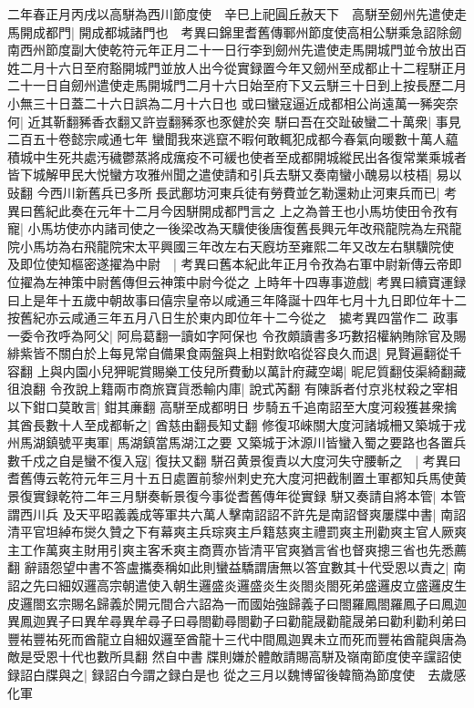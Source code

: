 二年春正月丙戌以高駢為西川節度使　辛巳上祀圓丘赦天下　高駢至劒州先遣使走馬開成都門|{
	開成都城諸門也　考異曰錦里耆舊傳鄆州節度使高相公駢乘急詔除劒南西州節度副大使乾符元年正月二十一日行李到劒州先遣使走馬開城門並令放出百姓二月十六日至府豁開城門並放人出今從實録置今年又劒州至成都止十二程駢正月二十一日自劒州遣使走馬開城門二月十六日始至府下又云駢三十日到上按長歷二月小無三十日蓋二十六日誤為二月十六日也}
或曰蠻寇逼近成都相公尚遠萬一豨突奈何|{
	近其靳翻豨香衣翻又許豈翻豨豕也豕健於突}
駢曰吾在交趾破蠻二十萬衆|{
	事見二百五十卷懿宗咸通七年}
蠻聞我來逃竄不暇何敢輒犯成都今春氣向暖數十萬人藴積城中生死共處汚穢鬱蒸將成癘疫不可緩也使者至成都開城縱民出各復常業乘城者皆下城解甲民大悦蠻方攻雅州聞之遣使請和引兵去駢又奏南蠻小醜易以枝梧|{
	易以䜴翻}
今西川新舊兵已多所長武鄜坊河東兵徒有勞費並乞勒還勑止河東兵而已|{
	考異曰舊紀此奏在元年十二月今因駢開成都門言之}
上之為普王也小馬坊使田令孜有寵|{
	小馬坊使亦内諸司使之一後梁改為天驥使後唐復舊長興元年改飛龍院為左飛龍院小馬坊為右飛龍院宋太平興國三年改左右天廐坊至雍熙二年又改左右騏驥院使}
及即位使知樞密遂擢為中尉　|{
	考異曰舊本紀此年正月令孜為右軍中尉新傳云帝即位擢為左神策中尉舊傳但云神策中尉今從之}
上時年十四專事遊戲|{
	考異曰續寶運録曰上是年十五歲中朝故事曰僖宗皇帝以咸通三年降誕十四年七月十九日即位年十二按舊紀亦云咸通三年五月八日生於東内即位年十二今從之　㨿考異四當作二}
政事一委令孜呼為阿父|{
	阿烏葛翻一讀如字阿保也}
令孜頗讀書多巧數招權納賄除官及賜緋紫皆不關白於上每見常自備果食兩盤與上相對飲啗從容良久而退|{
	見賢遍翻從千容翻}
上與内園小兒狎昵賞賜樂工伎兒所費動以萬計府藏空竭|{
	昵尼質翻伎渠綺翻藏徂浪翻}
令孜說上籍兩市商旅寶貨悉輸内庫|{
	說式芮翻}
有陳訴者付京兆杖殺之宰相以下鉗口莫敢言|{
	鉗其亷翻}
高駢至成都明日步騎五千追南詔至大度河殺獲甚衆擒其酋長數十人至成都斬之|{
	酋慈由翻長知丈翻}
修復邛崍關大度河諸城柵又築城于戎州馬湖鎮號平夷軍|{
	馬湖鎮當馬湖江之要}
又築城于沐源川皆蠻入蜀之要路也各置兵數千戍之自是蠻不復入寇|{
	復扶又翻}
駢召黄景復責以大度河失守腰斬之　|{
	考異曰耆舊傳云乾符元年三月十五日處置前黎州刺史充大度河把截制置土軍都知兵馬使黄景復實録乾符二年三月駢奏斬景復今事從耆舊傳年從實録}
駢又奏請自將本管|{
	本管謂西川兵}
及天平昭義義成等軍共六萬人擊南詔詔不許先是南詔督爽屢牒中書|{
	南詔清平官坦綽布爕久贊之下有幕爽主兵琮爽主戶籍慈爽主禮罰爽主刑勸爽主官人厥爽主工作萬爽主財用引爽主客禾爽主商賈亦皆清平官爽猶言省也督爽摠三省也先悉薦翻}
辭語怨望中書不答盧攜奏稱如此則蠻益驕謂唐無以答宜數其十代受恩以責之|{
	南詔之先曰細奴邏高宗朝遣使入朝生邏盛炎邏盛炎生炎閤炎閤死弟盛邏皮立盛邏皮生皮邏閤玄宗賜名歸義於開元間合六詔為一而國始強歸義子曰閤羅鳳閤羅鳳子曰鳳迦異鳳迦異子曰異牟尋異牟尋子曰尋閤勸尋閤勸子曰勸龍晟勸龍晟弟曰勸利勸利弟曰豐祐豐祐死而酋龍立自細奴邏至酋龍十三代中間鳳迦異未立而死而豐祐酋龍與唐為敵是受恩十代也數所具翻}
然自中書牒則嫌於體敵請賜高駢及嶺南節度使辛讜詔使録詔白牒與之|{
	録詔白今謂之録白是也}
從之三月以魏博留後韓簡為節度使　去歲感化軍

